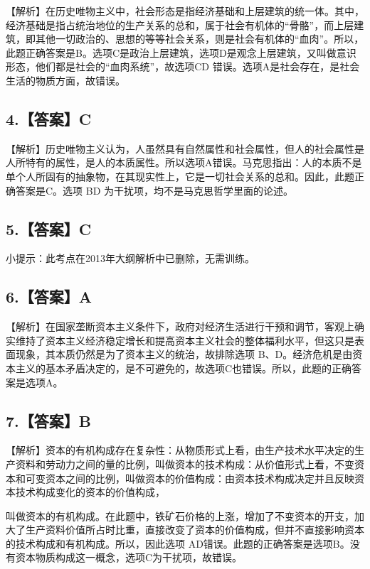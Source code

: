 \documentclass[UTF8,11pt]{ctexart}
\begin{document}
【解析】在历史唯物主义中，社会形态是指经济基础和上层建筑的统一体。其中，经济基础是指占统治地位的生产关系的总和，属于社会有机体的“骨骼”，而上层建筑，即其他一切政治的、思想的等等社会关系，则是社会有机体的“血肉”。所以，此题正确答案是B。选项C是政治上层建筑，选项D是观念上层建筑，又叫做意识形态，他们都是社会的“血肉系统”，故选项CD 错误。选项A是社会存在，是社会生活的物质方面，故错误。


\subsection*{4.【答案】C}

【解析】历史唯物主义认为，人虽然具有自然属性和社会属性，但人的社会属性是人所特有的属性，是人的本质属性。所以选项A错误。马克思指出：人的本质不是单个人所固有的抽象物，在其现实性上，它是一切社会关系的总和。因此，此题正确答案是C。选项 BD 为干扰项，均不是马克思哲学里面的论述。


\subsection*{5.【答案】C}

小提示：此考点在2013年大纲解析中已删除，无需训练。


\subsection*{6.【答案】A}

【解析】在国家垄断资本主义条件下，政府对经济生活进行干预和调节，客观上确实维持了资本主义经济稳定增长和提高资本主义社会的整体福利水平，但这只是表面现象，其本质仍然是为了资本主义的统治，故排除选项 B、D。经济危机是由资本主义的基本矛盾决定的，是不可避免的，故选项C也错误。所以，此题的正确答案是选项A。


\subsection*{7.【答案】B}

【解析】资本的有机构成存在复杂性：从物质形式上看，由生产技术水平决定的生产资料和劳动力之间的量的比例，叫做资本的技术构成：从价值形式上看，不变资本和可变资本之间的比例，叫做资本的价值构成：由资本技术构成决定并且反映资本技术构成变化的资本的价值构成，


叫做资本的有机构成。在此题中，铁矿石价格的上涨，增加了不变资本的开支，加大了生产资料价值所占时比重，直接改变了资本的价值构成，但并不直接影响资本的技术构成和有机构成。所以，因此选项 AD错误。此题的正确答案是选项B。没有资本物质构成这一概念，选项C为干扰项，故错误。
\end{document}
